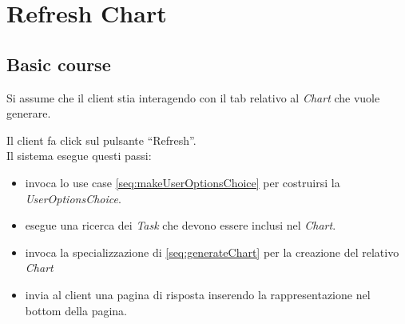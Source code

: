\section{Refresh Chart}
\label{seq:refreshChart}
\subsection{Basic course}
Si assume che il client stia interagendo con il tab relativo al \emph{Chart}
che vuole generare.

Il client fa click sul pulsante ``Refresh''.\\
Il sistema esegue questi passi:
\begin{itemize}
  \item invoca lo use case \ref{seq:makeUserOptionsChoice} per costruirsi la
  \emph{UserOptionsChoice}.
  \item esegue una ricerca dei \emph{Task} che devono essere inclusi nel
  \emph{Chart}.  
  \item invoca la specializzazione di \ref{seq:generateChart} per la
  creazione del relativo \emph{Chart}
  \item invia al client una pagina di risposta inserendo la rappresentazione
  nel bottom della pagina.
\end{itemize}